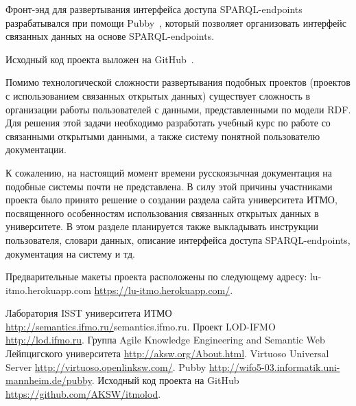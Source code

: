 \documentclass[10pt, a5paper]{article}
\begin{document}
Фронт-энд для развертывания интерфейса доступа SPARQL-endpoints разрабатывался при помощи Pubby~\cite{Radchenko5}, который позволяет организовать интерфейс связанных данных на основе SPARQL-endpoints.

Исходный код проекта выложен на GitHub~\cite{Radchenko6}.

Помимо технологической сложности развертывания подобных проектов (проектов с использованием связанных открытых данных) существует сложность в организации работы пользователей с данными, представленными по модели RDF. Для решения этой задачи необходимо разработать учебный курс по работе со связанными открытыми данными, а также систему понятной пользователю документации.

К сожалению, на настоящий момент времени русскоязычная документация на подобные системы почти не представлена. В силу этой причины участниками проекта было принято решение о создании раздела сайта университета ИТМО, посвященного особенностям использования связанных открытых данных в университете. В этом разделе планируется также выкладывать инструкции пользователя, словари данных, описание интерфейса доступа SPARQL-endpoints, документация на систему и тд.

Предварительные макеты проекта расположены по следующему адресу: lu-itmo.herokuapp.com \url{https://lu-itmo.herokuapp.com/}.

\begin{thebibliography}{99}
 Лаборатория ISST университета ИТМО \url{http://semantics.ifmo.ru/}{semantics.ifmo.ru}.
 Проект LOD-IFMO \url{http://lod.ifmo.ru}.
 Группа Agile Knowledge Engineering and Semantic Web Лейпцигского университета \url{http://aksw.org/About.html}.
 Virtuoso Universal Server \url{http://virtuoso.openlinksw.com/}.
 Pubby \url{http://wifo5-03.informatik.uni-mannheim.de/pubby}.
 Исходный код проекта на GitHub \url{https://github.com/AKSW/itmolod}.
\end{thebibliography}
\end{document}

